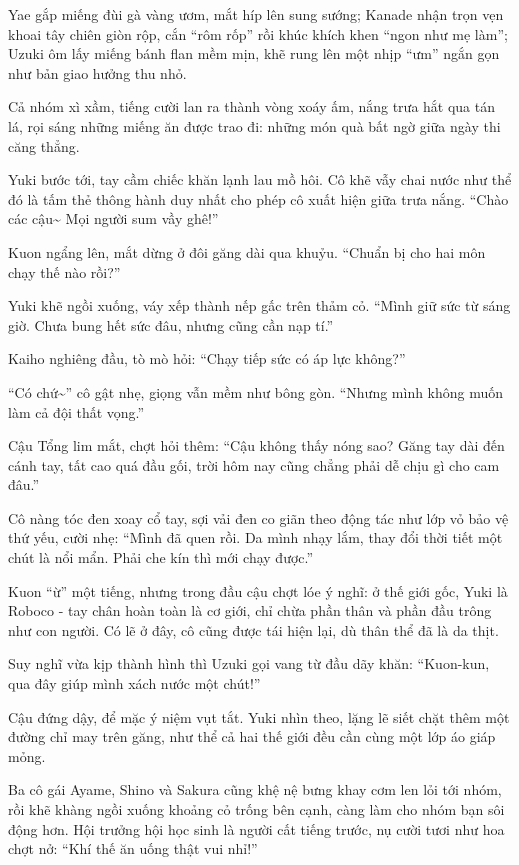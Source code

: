 \documentclass[../main.tex]{subfiles}
\begin{document}
Yae gắp miếng đùi gà vàng ươm, mắt híp lên sung sướng; Kanade nhận trọn vẹn khoai tây chiên giòn rộp, cắn ``rôm rốp'' rồi khúc khích khen ``ngon như mẹ làm''; Uzuki ôm lấy miếng bánh flan mềm mịn, khẽ rung lên một nhịp ``ưm'' ngắn gọn như bản giao hưởng thu nhỏ.

Cả nhóm xì xầm, tiếng cười lan ra thành vòng xoáy ấm, nắng trưa hắt qua tán lá, rọi sáng những miếng ăn được trao đi: những món quà bất ngờ giữa ngày thi căng thẳng.

\il

Yuki bước tới, tay cầm chiếc khăn lạnh lau mồ hôi. Cô khẽ vẫy chai nước như thể đó là tấm thẻ thông hành duy nhất cho phép cô xuất hiện giữa trưa nắng. ``Chào các cậu\~{} Mọi người sum vầy ghê!''

Kuon ngẩng lên, mắt dừng ở đôi găng dài qua khuỷu. ``Chuẩn bị cho hai môn chạy thế nào rồi?''

Yuki khẽ ngồi xuống, váy xếp thành nếp gấc trên thảm cỏ. ``Mình giữ sức từ sáng giờ. Chưa bung hết sức đâu, nhưng cũng cần nạp tí.''

Kaiho nghiêng đầu, tò mò hỏi: ``Chạy tiếp sức có áp lực không?''

``Có chứ\~{}'' cô gật nhẹ, giọng vẫn mềm như bông gòn. ``Nhưng mình không muốn làm cả đội thất vọng.''

Cậu Tổng lim mắt, chợt hỏi thêm: ``Cậu không thấy nóng sao? Găng tay dài đến cánh tay, tất cao quá đầu gối, trời hôm nay cũng chẳng phải dễ chịu gì cho cam đâu.''

Cô nàng tóc đen xoay cổ tay, sợi vải đen co giãn theo động tác như lớp vỏ bảo vệ thứ yếu, cười nhẹ: ``Mình đã quen rồi. Da mình nhạy lắm, thay đổi thời tiết một chút là nổi mẩn. Phải che kín thì mới chạy được.''

Kuon ``ừ'' một tiếng, nhưng trong đầu cậu chợt lóe ý nghĩ: ở thế giới gốc, Yuki là Roboco - tay chân hoàn toàn là cơ giới, chỉ chừa phần thân và phần đầu trông như con người. Có lẽ ở đây, cô cũng được tái hiện lại, dù thân thể đã là da thịt.

Suy nghĩ vừa kịp thành hình thì Uzuki gọi vang từ đầu dãy khăn: ``Kuon-kun, qua đây giúp mình xách nước một chút!''

Cậu đứng dậy, để mặc ý niệm vụt tắt. Yuki nhìn theo, lặng lẽ siết chặt thêm một đường chỉ may trên găng, như thể cả hai thế giới đều cần cùng một lớp áo giáp mỏng.

\il

Ba cô gái Ayame, Shino và Sakura cũng khệ nệ bưng khay cơm len lỏi tới nhóm, rồi khẽ khàng ngồi xuống khoảng cỏ trống bên cạnh, càng làm cho nhóm bạn sôi động hơn. Hội trưởng hội học sinh là người cất tiếng trước, nụ cười tươi như hoa chợt nở: ``Khí thế ăn uống thật vui nhỉ!''
\end{document}
